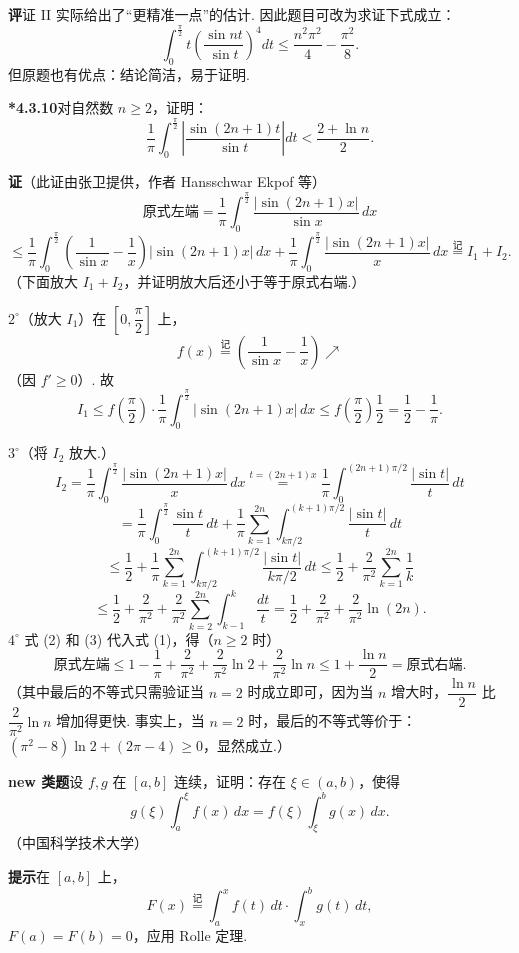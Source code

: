 \documentclass[UTF8,12pt,a4paper,fontset=fandol]{ctexart}
\begin{document}
\noindent\textbf{评}\quad 证 II 实际给出了“更精准一点”的估计. 因此题目可改为求证下式成立：
\[
\int_0^{\frac\pi2}t\left(\frac{\sin nt}{\sin t}\right)^4dt
\le\frac{n^2\pi^2}{4}-\frac{\pi^2}{8}.
\]
但原题也有优点：结论简洁，易于证明.

\noindent\textbf{*4.3.10}\quad 对自然数 $n\ge2$，证明：
\[
\frac1\pi\int_0^{\frac\pi2}\left|\frac{\sin(2n+1)t}{\sin t}\right|dt
<\frac{2+\ln n}{2}.
\]

\noindent\textbf{证}\quad （此证由张卫提供，作者 Hansschwar Ekpof 等）
\[
\text{原式左端}=\frac1\pi\int_0^{\frac\pi2}
\frac{|\sin(2n+1)x|}{\sin x}\,dx
\]
\[
\le\frac1\pi\int_0^{\frac\pi2}\left(\frac1{\sin x}-\frac1x\right)
|\sin(2n+1)x|\,dx
+\frac1\pi\int_0^{\frac\pi2}\frac{|\sin(2n+1)x|}{x}\,dx
\stackrel{\text{记}}{=}I_1+I_2.
\tag{1}
\]
（下面放大 $I_1+I_2$，并证明放大后还小于等于原式右端.）

$2^\circ$（放大 $I_1$）在 $\left[0,\dfrac\pi2\right]$ 上，
\[
f(x)\stackrel{\text{记}}{=}\left(\frac1{\sin x}-\frac1x\right)\nearrow
\]
（因 $f'\ge0$）. 故
\[
I_1\le f\left(\frac\pi2\right)\cdot\frac1\pi
\int_0^{\frac\pi2}|\sin(2n+1)x|\,dx
\le f\left(\frac\pi2\right)\frac12
=\frac12-\frac1\pi.
\tag{2}
\]

$3^\circ$（将 $I_2$ 放大.）
\[
I_2=\frac1\pi\int_0^{\frac\pi2}\frac{|\sin(2n+1)x|}{x}\,dx
\stackrel{t=(2n+1)x}{=}
\frac1\pi\int_0^{(2n+1)\pi/2}\frac{|\sin t|}{t}\,dt
\]
\[
=\frac1\pi\int_0^{\frac\pi2}\frac{\sin t}{t}\,dt
+\frac1\pi\sum_{k=1}^{2n}\int_{k\pi/2}^{(k+1)\pi/2}\frac{|\sin t|}{t}\,dt
\]
\[
\le\frac12+\frac1\pi\sum_{k=1}^{2n}\int_{k\pi/2}^{(k+1)\pi/2}\frac{|\sin t|}{k\pi/2}\,dt
\le\frac12+\frac2{\pi^2}\sum_{k=1}^{2n}\frac1k
\]
\[
\le\frac12+\frac2{\pi^2}+\frac2{\pi^2}\sum_{k=2}^{2n}\int_{k-1}^k\frac{dt}{t}
=\frac12+\frac2{\pi^2}+\frac2{\pi^2}\ln(2n).
\tag{3}
\]
$4^\circ$ 式 (2) 和 (3) 代入式 (1)，得（$n\ge2$ 时）
\[
\text{原式左端}\le
1-\frac1\pi+\frac2{\pi^2}+\frac2{\pi^2}\ln2+\frac2{\pi^2}\ln n
\le 1+\frac{\ln n}{2}
=\text{原式右端}.
\]
（其中最后的不等式只需验证当 $n=2$ 时成立即可，因为当 $n$ 增大时，$\dfrac{\ln n}{2}$ 比 $\dfrac2{\pi^2}\ln n$ 增加得更快. 事实上，当 $n=2$ 时，最后的不等式等价于：$(\pi^2-8)\ln2+(2\pi-4)\ge0$，显然成立.）

\noindent\textbf{new 类题}\quad 设 $f,g$ 在 $[a,b]$ 连续，证明：存在 $\xi\in(a,b)$，使得
\[
g(\xi)\int_a^\xi f(x)\,dx=f(\xi)\int_\xi^b g(x)\,dx.
\]
（中国科学技术大学）

\noindent\textbf{提示}\quad 在 $[a,b]$ 上，
\[
F(x)\stackrel{\text{记}}{=}\int_a^x f(t)\,dt\cdot\int_x^b g(t)\,dt,
\]
$F(a)=F(b)=0$，应用 Rolle 定理.
\end{document}
